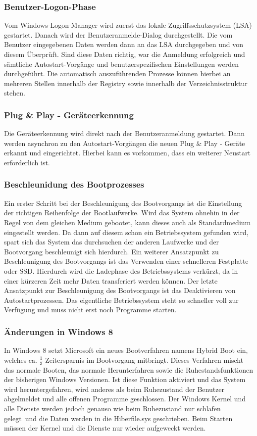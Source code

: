 \subsubsection{Benutzer-Logon-Phase}
Vom Windows-Logon-Manager wird zuerst das lokale Zugriffsschutzsystem (LSA) gestartet. Danach wird der Benutzeranmelde-Dialog durchgestellt. Die vom Benutzer eingegebenen Daten werden dann an das LSA durchgegeben und von diesem Überprüft. Sind diese Daten richtig, war die Anmeldung erfolgreich und sämtliche Autostart-Vorgänge und benutzerspezifischen Einstellungen werden durchgeführt. Die automatisch auszuführenden Prozesse können hierbei an mehreren Stellen innerhalb der Registry sowie innerhalb der Verzeichnisstruktur stehen.

\subsubsection{Plug \& Play - Geräteerkennung}
Die Geräteerkennung wird direkt nach der Benutzeranmeldung gestartet. Dann werden asynchron zu den Autostart-Vorgängen die neuen Plug \& Play - Geräte erkannt und eingerichtet.  Hierbei kann es vorkommen, dass ein weiterer Neustart erforderlich ist.

\subsubsection{Beschleunidung des Bootprozesses}
Ein erster Schritt bei der Beschleunigung des Bootvorgangs ist die Einstellung der richtigen Reihenfolge der Bootlaufwerke. Wird das System ohnehin in der Regel von dem gleichen Medium gebootet, kann dieses auch als Standardmedium eingestellt werden. Da dann auf diesem schon ein Betriebssystem gefunden wird, spart sich das System das durchsuchen der anderen Laufwerke und der Bootvorgang beschleunigt sich hierdurch. Ein weiterer Ansatzpunkt zu Beschleunigung des Bootvorgangs ist das Verwenden einer schnelleren Festplatte oder SSD. Hierdurch wird die Ladephase des Betriebssystems verkürzt, da in einer kürzeren Zeit mehr Daten transferiert werden können. Der letzte Ansatzpunkt zur Beschleunigung des Bootvorgangs ist das Deaktivieren von Autostartprozessen. Das eigentliche Betriebssystem steht so schneller voll zur Verfügung und muss nicht erst noch Programme starten.

\subsubsection{Änderungen in Windows 8}
In Windows 8 setzt Microsoft ein neues Bootverfahren namens Hybrid Boot ein, welches ca. $\frac{1}{3}$ Zeitersparnis im Bootvorgang mitbringt. Dieses Verfahren mischt das normale Booten, das normale Herunterfahren sowie die Ruhestandsfunktionen der bisherigen Windows Versionen. Ist diese Funktion aktiviert und das System wird heruntergefahren, wird anderes als beim Ruhezustand der Benutzer abgelmeldet und alle offenen Programme geschlossen. Der Windows Kernel und alle Dienste werden jedoch genauso wie beim Ruhezustand nur \ql schlafen gelegt\qr\ und die Daten werden in die Hiberfile.sys geschrieben. Beim Starten müssen der Kernel und die Dienste nur wieder aufgeweckt werden.


